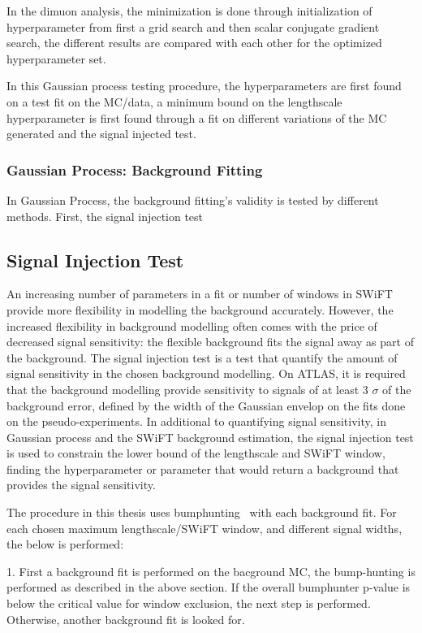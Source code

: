     In the dimuon analysis, the minimization is done through initialization of hyperparameter from first a grid search and then scalar conjugate gradient search, the different results are compared with each other for the optimized hyperparameter set.

    In this Gaussian process testing procedure, the hyperparameters are first found on a test fit on the MC/data, a minimum bound on the lengthscale hyperparameter is first found through a fit on different variations of the MC generated and the signal injected test.

\subsubsection{Gaussian Process: Background Fitting}
In Gaussian Process, the background fitting's validity is tested by different methods. First, the signal injection test 

\subsection{Signal Injection Test}
    \label{sec:signalInjection}
    An increasing number of parameters in a fit or number of windows in SWiFT provide more flexibility in modelling the background accurately. However, the increased flexibility in background modelling often comes with the price of decreased signal sensitivity: the flexible background fits the signal away as part of the background. The signal injection test is a test that quantify the amount of signal sensitivity in the chosen background modelling. On ATLAS, it is required that the background modelling provide sensitivity to signals of at least 3 $\sigma$ of the background error, defined by the width of the Gaussian envelop on the fits done on the pseudo-experiments. In additional to quantifying signal sensitivity, in Gaussian process and the SWiFT background estimation, the signal injection test is used to constrain the lower bound of the lengthscale and SWiFT window, finding the hyperparameter or parameter that would return a background that provides the signal sensitivity. 

    The procedure in this thesis uses bumphunting~\cite{choudalakis2011hypothesis} with each background fit.
   For each chosen maximum lengthscale/SWiFT window, and different signal widths, the below is performed:

   1. First a background fit is performed on the bacground MC, the bump-hunting is performed as described in the above section. If the overall bumphunter p-value is below the critical value for window exclusion, the next step is performed. Otherwise, another background fit is looked for.

